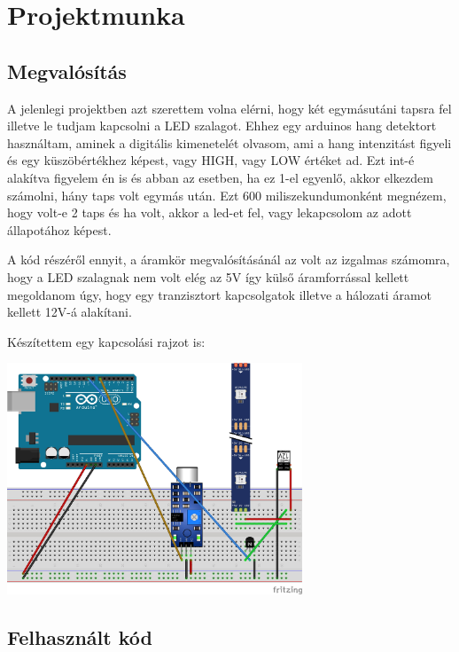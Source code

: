 \documentclass[a4paper,11pt]{article}
\begin{document}
\section{Projektmunka}

\subsection{Megvalósítás}

A jelenlegi projektben azt szerettem volna elérni, hogy két egymásutáni tapsra fel illetve le tudjam kapcsolni a LED szalagot. Ehhez egy arduinos hang detektort használtam, aminek a digitális kimenetelét olvasom, ami a hang intenzitást figyeli és egy küszöbértékhez képest, vagy HIGH, vagy LOW értéket ad. Ezt int-é alakítva figyelem én is és abban az esetben, ha ez 1-el egyenlő, akkor elkezdem számolni, hány taps volt egymás után. Ezt 600 miliszekundumonként megnézem, hogy volt-e 2 taps és ha volt, akkor a led-et fel, vagy lekapcsolom az adott állapotához képest. 

A kód részéről ennyit, a áramkör megvalósításánál az volt az izgalmas számomra, hogy a LED szalagnak nem volt elég az 5V így külső áramforrással kellett megoldanom úgy, hogy egy tranzisztort kapcsolgatok illetve a hálozati áramot kellett 12V-á alakítani.

Készítettem egy kapcsolási rajzot is:

\begin{center}
\includegraphics[width=0.66\textwidth]{Clapping_lamp_fritzing_bb.jpg}
\end{center}



\subsection{Felhasznált kód}
\end{document}
